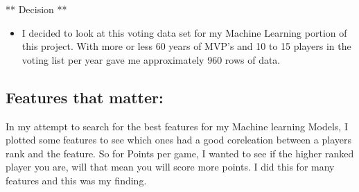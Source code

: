 \documentclass[11pt]{article}
\providecommand{\tightlist}{%
      \setlength{\itemsep}{0pt}\setlength{\parskip}{0pt}}
\begin{document}
** Decision **

\begin{itemize}
\tightlist
\item
  I decided to look at this voting data set for my Machine Learning
  portion of this project. With more or less 60 years of MVP's and 10 to
  15 players in the voting list per year gave me approximately 960 rows
  of data.
\end{itemize}

    \subsection{Features that matter:}\label{features-that-matter}

In my attempt to search for the best features for my Machine learning
Models, I plotted some features to see which ones had a good coreleation
between a players rank and the feature. So for Points per game, I wanted
to see if the higher ranked player you are, will that mean you will
score more points. I did this for many features and this was my finding.
\end{document}

